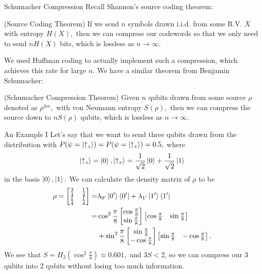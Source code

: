 \documentclass{beamer}
\begin{document}
\begin{frame}{Schumacher Compression}
Recall Shannon's source coding theorem:
\begin{theorem} (Source Coding Theorem)
If we send $n$ symbols drawn i.i.d. from some R.V. $X$ with entropy $H(X),$ then we can compress our codewords so that we only need to send $nH(X)$ bits, which is lossless as $n\to \infty.$
\end{theorem}
We used Huffman coding to actually implement such a compression, which achieves this rate for large $n.$ We have a similar theorem from Benjamin Schumacher:
\begin{theorem} (Schumacher Compression Theorem)
    Given $n$ qubits drawn from some source $\rho$ denoted as $\rho^{\otimes n},$ with von Neumann entropy $S(\rho),$ then we can compress the source down to $nS(\rho)$ qubits, which is lossless as $n\to\infty.$
\end{theorem}
\end{frame}
\begin{frame}{An Example I}
Let's say that we want to send three qubits drawn from the distribution with $P(\psi=\ket{\uparrow_z})=P(\psi=\ket{\uparrow_x})=0.5,$ where
\[\ket{\uparrow_z}=\ket{0},\ket{\uparrow_x}=\frac{1}{\sqrt{2}}\ket{0}+\frac{1}{\sqrt{2}}\ket{1}\] in the basis $\ket{0},\ket{1}.$ We can calculate the density matrix of $\rho$ to be
\begin{align*}\rho=\begin{bmatrix}
    \frac34&\frac14\\\frac14&\frac14
\end{bmatrix}=&\lambda_{0'}\ket{0'}\bra{0'}+\lambda_{1'}\ket{1'}\bra{1'}\\=&\cos^2\frac{\pi}{8}\begin{bmatrix}
    \cos\frac\pi 8\\\sin\frac\pi 8
\end{bmatrix}\begin{bmatrix}
    \cos\frac\pi 8&\sin\frac\pi 8
\end{bmatrix}\\&+\sin^2\frac{\pi}{8}\begin{bmatrix}
    \sin\frac\pi 8\\-\cos\frac\pi 8
\end{bmatrix}\begin{bmatrix}
    \sin\frac\pi 8&-\cos\frac\pi 8
\end{bmatrix}.\end{align*}
We see that $S=H_2(\cos^2\frac\pi 8)\approx 0.601,$ and $3S<2$, so we can compress our 3 qubits into 2 qubits without losing too much information.
\end{frame}
\end{document}
